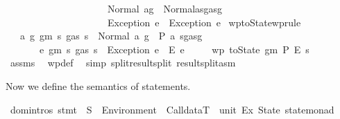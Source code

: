 \begin{isabellebody}
\ \ \ \ \ \ \ \ \ \ \ \ \ \ \ \ \ \ \ \ \ Normal\ {\isacharparenleft}{\kern0pt}a{\isacharcomma}{\kern0pt}g{\isacharparenright}{\kern0pt}\ {\isasymRightarrow}\ Normal{\isacharparenleft}{\kern0pt}a{\isacharcomma}{\kern0pt}s{\isasymlparr}gas{\isacharcolon}{\kern0pt}{\isacharequal}{\kern0pt}g{\isasymrparr}{\isacharparenright}{\kern0pt}\isanewline
\ \ \ \ \ \ \ \ \ \ \ \ \ \ \ \ \ \ \ \ {\isacharbar}{\kern0pt}\ Exception\ e\ {\isasymRightarrow}\ Exception\ e{\isacharparenright}{\kern0pt}{\isachardoublequoteclose}\isanewline
\isanewline
{}\isamarkupfalse%
\ wptoState{\isacharbrackleft}{\kern0pt}wprule{\isacharbrackright}{\kern0pt}{\isacharcolon}{\kern0pt}\isanewline
\ \ \ {\isachardoublequoteopen}{\isasymAnd}a\ g{\isachardot}{\kern0pt}\ gm\ s\ {\isacharparenleft}{\kern0pt}gas\ s{\isacharparenright}{\kern0pt}\ {\isacharequal}{\kern0pt}\ Normal\ {\isacharparenleft}{\kern0pt}a{\isacharcomma}{\kern0pt}\ g{\isacharparenright}{\kern0pt}\ {\isasymLongrightarrow}\ P\ a\ {\isacharparenleft}{\kern0pt}s{\isasymlparr}gas{\isacharcolon}{\kern0pt}{\isacharequal}{\kern0pt}g{\isasymrparr}{\isacharparenright}{\kern0pt}{\isachardoublequoteclose}\isanewline
\ \ \ \ \ \ \ {\isachardoublequoteopen}{\isasymAnd}e{\isachardot}{\kern0pt}\ gm\ s\ {\isacharparenleft}{\kern0pt}gas\ s{\isacharparenright}{\kern0pt}\ {\isacharequal}{\kern0pt}\ Exception\ e\ {\isasymLongrightarrow}\ E\ e{\isachardoublequoteclose}\isanewline
\ \ \ \ \ {\isachardoublequoteopen}wp\ {\isacharparenleft}{\kern0pt}toState\ gm{\isacharparenright}{\kern0pt}\ P\ E\ s{\isachardoublequoteclose}\isanewline
%
\isadelimproof
\ \ %
\endisadelimproof
%
\isatagproof
{}\isamarkupfalse%
\ assms\ \isamarkupfalse%
\ wp{\isacharunderscore}{\kern0pt}def\ \isamarkupfalse%
\ {\isacharparenleft}{\kern0pt}simp\ split{\isacharcolon}{\kern0pt}result{\isachardot}{\kern0pt}split\ result{\isachardot}{\kern0pt}split{\isacharunderscore}{\kern0pt}asm{\isacharparenright}{\kern0pt}%
\endisatagproof
{\isafoldproof}%
%
\isadelimproof
%
\endisadelimproof
%
\begin{isamarkuptext}%
Now we define the semantics of statements.%
\end{isamarkuptext}\isamarkuptrue%
\isamarkupfalse%
\ {\isacharparenleft}{\kern0pt}domintros{\isacharparenright}{\kern0pt}\ stmt\ {\isacharcolon}{\kern0pt}{\isacharcolon}{\kern0pt}\ {\isachardoublequoteopen}S\ {\isasymRightarrow}\ Environment\ {\isasymRightarrow}\ CalldataT\ {\isasymRightarrow}\ {\isacharparenleft}{\kern0pt}unit{\isacharcomma}{\kern0pt}\ Ex{\isacharcomma}{\kern0pt}\ State{\isacharparenright}{\kern0pt}\ state{\isacharunderscore}{\kern0pt}monad{\isachardoublequoteclose}\isanewline

\end{isabellebody}
